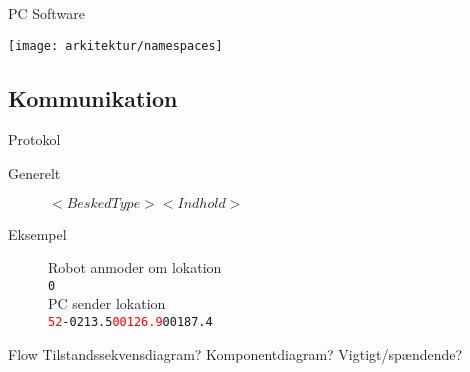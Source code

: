\begin{frame}{PC Software}
\begin{center}
\texttt{[image: arkitektur/namespaces]}
\end{center}
\end{frame}

\subsection{Kommunikation}

\begin{frame}{Protokol}
\begin{description}
\item[Generelt]{$< BeskedType >< Indhold >$}
\item[Eksempel]{Robot anmoder om lokation\\
\texttt{0}\\
PC sender lokation\\
\texttt{\textcolor{red}{52}-0213.5\textcolor{red}{00126.9}00187.4}}
\end{description}
\end{frame}

\begin{frame}{Flow}
Tilstandssekvensdiagram? Komponentdiagram? Vigtigt/spændende?
\end{frame}
